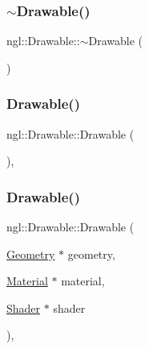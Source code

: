 \subsubsection{\texorpdfstring{$\sim$\+Drawable()}{~Drawable()}}
{\footnotesize\ttfamily ngl\+::\+Drawable\+::$\sim$\+Drawable (\begin{DoxyParamCaption}{ }\end{DoxyParamCaption})\hspace{0.3cm}{\ttfamily [virtual]}}

\mbox{\label{classngl_1_1_drawable_ad815031b7a8f997364dcbee94fa4bc91}} 
\subsubsection{\texorpdfstring{Drawable()}{Drawable()}\hspace{0.1cm}{\footnotesize\ttfamily [1/2]}}
{\footnotesize\ttfamily ngl\+::\+Drawable\+::\+Drawable (\begin{DoxyParamCaption}{ }\end{DoxyParamCaption})\hspace{0.3cm}{\ttfamily [explicit]}, {\ttfamily [protected]}}

\mbox{\label{classngl_1_1_drawable_a8d21b3491e08f42b7e7229bc4dab5b44}} 
\subsubsection{\texorpdfstring{Drawable()}{Drawable()}\hspace{0.1cm}{\footnotesize\ttfamily [2/2]}}
{\footnotesize\ttfamily ngl\+::\+Drawable\+::\+Drawable (\begin{DoxyParamCaption}\item[{\mbox{\hyperlink{classngl_1_1_geometry}{Geometry}} $\ast$}]{geometry,  }\item[{\mbox{\hyperlink{classngl_1_1_material}{Material}} $\ast$}]{material,  }\item[{\mbox{\hyperlink{classngl_1_1_shader}{Shader}} $\ast$}]{shader }\end{DoxyParamCaption})\hspace{0.3cm}{\ttfamily [explicit]}, {\ttfamily [protected]}}



